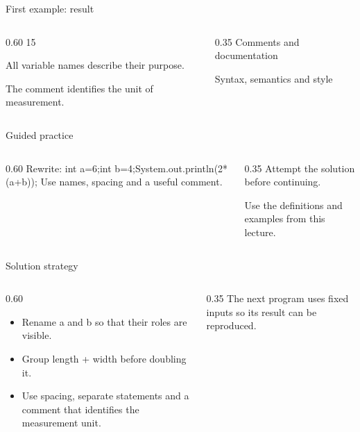 \documentclass[10pt,aspectratio=169]{beamer}
\begin{document}
\begin{frame}[fragile,t]{First example: result}
\begin{columns}[T,onlytextwidth]\begin{column}{0.60\textwidth}
15\par All variable names describe their purpose.\par The comment identifies the unit of measurement.
\end{column}\begin{column}{0.35\textwidth}\small
Comments and documentation

Syntax, semantics and style
\end{column}\end{columns}
\end{frame}

\begin{frame}[fragile,t]{Guided practice}
\begin{columns}[T,onlytextwidth]\begin{column}{0.60\textwidth}
Rewrite: int a=6;int b=4;System.out.println(2*(a+b)); Use names, spacing and a useful comment.
\end{column}\begin{column}{0.35\textwidth}\small
Attempt the solution before continuing.

Use the definitions and examples from this lecture.
\end{column}\end{columns}
\end{frame}

\begin{frame}[fragile,t]{Solution strategy}
\begin{columns}[T,onlytextwidth]\begin{column}{0.60\textwidth}
\begin{itemize}
\item Rename a and b so that their roles are visible.
\item Group length + width before doubling it.
\item Use spacing, separate statements and a comment that identifies the measurement unit.
\end{itemize}
\end{column}\begin{column}{0.35\textwidth}\small
The next program uses fixed inputs so its result can be reproduced.
\end{column}\end{columns}
\end{frame}
\end{document}
